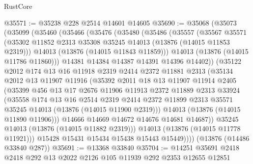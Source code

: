 \begin{lexlean}{RustCore}
\begin{coremodule}
@35571 := @35238 @228 @2514 @14601 @14605
@35690 := @35068
    (@35073
      (@35099
        (@35460
          (@35466
            (@35476
              (@35480
                (@35486
                  (@35557
                    (@35567
                      @35571
                      (@35302 @11852 @2313 @35308 @35245 @14013 (@13876 (@14015 @11853 @2319)))
                      @14013
                      (@13876 (@14015 @11843 @11859)))
                    @14013
                    (@13876 (@14015 @11786 @11860)))
                  @14381
                  @14384
                  @14387
                  @14391
                  @14396
                  @14402))
              (@35122
                @2012
                @174
                @13
                @16
                @11918
                @2319
                @2414
                @2372
                @11881
                @2313
                (@35134
                  @2012
                  @13
                  @11907
                  @11916
                  (@35392
                    @2011
                    @18
                    @13
                    @11907
                    @11914
                    @2405
                    (@35399
                      @456
                      @13
                      @17
                      @2676
                      @11906
                      @11913
                      @2372
                      @11889
                      @2313
                      @33924
                      (@35558
                        @174
                        @13
                        @16
                        @2514
                        @2319
                        @2414
                        @2372
                        @11899
                        @2313
                        @35571
                        @35245
                        @14013
                        (@13876 (@14015 @11900 @2319)))
                      @14013
                      (@13876 (@14015 @11890 @11906)))
                    @14666
                    @14669
                    @14672
                    @14676
                    @14681
                    @14687))
                @35245
                @14013
                (@13876 (@14015 @11882 @2319)))
              @14013
              (@13876 (@14015 @11778 @11921)))
            @15428
            @15431
            @15434
            @15438
            @15443
            @15449))))
    (@13876 (@14486 @33840 @287))
@35691 := @13368 @33840
@35704 := @14251 @35691 @2418 @2418 @292 @13 @2022 @2126 @105 @11939 @292 @2353 @12655 @12851

\end{coremodule}
\end{lexlean}
